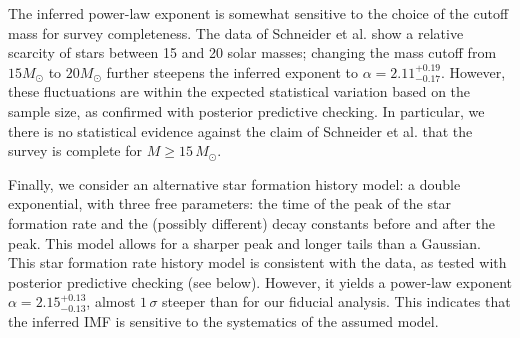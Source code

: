 \documentclass[12pt]{article}
\newcommand{\MSun}{M_\odot}
\newcommand{\onesigrange}[3]{\ensuremath{#1^{+#2}_{-#3}}}
\newcommand{\alpharangethree}{\onesigrange{2.11}{0.19}{0.17}}
\newcommand{\alpharangefour}{\onesigrange{2.15}{0.13}{0.13}}
\begin{document}
The inferred power-law exponent is somewhat sensitive to
the choice of the cutoff mass for survey completeness.  The data of Schneider et al.\cite{Schneider:2018} show a relative scarcity of stars between 15 and 20 solar masses; changing the mass cutoff from $15 M_\odot$ to $20 M_\odot$ further steepens the inferred exponent to $\alpha=\alpharangethree$.    However, these fluctuations are within the expected statistical variation based on the sample size, as confirmed with posterior predictive
checking.  In particular, we there is no statistical evidence against the claim of Schneider et al.\cite{Schneider:2018} that
the survey is complete for $M \geq 15 \, \MSun$.

Finally, we consider an alternative star formation history model: a double exponential, with three free parameters: the time of the peak of the star formation rate and the (possibly different) decay constants before and after the peak.  This model allows for a sharper peak and longer tails than a Gaussian.  This star formation rate history model is consistent with the data, as tested with posterior predictive checking (see below).  However, it yields a power-law exponent $\alpha=\alpharangefour$, almost  $1\, \sigma$ steeper than for our fiducial analysis.  This indicates that the inferred IMF is sensitive to the systematics of the assumed model.
\end{document}
